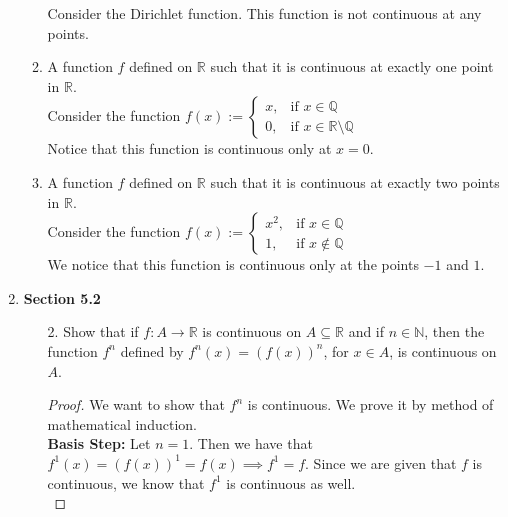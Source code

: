\documentclass[12pt,letterpaper]{article}
\newcommand{\R}{\mathbb{R}}
\newcommand{\N}{\mathbb{N}}
\newcommand{\Q}{\mathbb{Q}}
\theoremstyle{case}
\theoremstyle{definition}
\begin{document}
\begin{enumerate}
\begin{enumerate}
			Consider the Dirichlet function. This function is not continuous at any points.
			
			\item A function $f$ defined on $\R$ such that it is continuous at exactly one point in $\R$.\\
			
			Consider the function $f(x):= \begin{cases}
				x, & \text{if } x \in \Q \\
				0, & \text{if } x \in \R \setminus \Q
			\end{cases}$ \\
			Notice that this function is continuous only at $x=0$.
			
			\item A function $f$ defined on $\R$ such that it is continuous at exactly two points in $\R$.\\
			
			Consider the function $f(x):=\begin{cases}
				x^2, & \text{if } x \in \Q \\
				1, &\text{if } x \notin \Q
			\end{cases}$ \\
			We notice that this function is continuous only at the points $-1$ and $1$.
		\end{enumerate}	
	
		\item \textbf{Section 5.2}
		\begin{enumerate}
			\item[2.] Show that if $f:A \to \R$ is continuous on $A \subseteq \R$ and if $n \in \N$, then the function $f^n$ defined by $f^n(x)=(f(x))^n$, for $x \in A$, is continuous on $A$.\\
			
			\begin{proof}
				We want to show that $f^n$ is continuous. We prove it by method of mathematical induction.\\
				
				\textbf{Basis Step:} Let $n=1$. Then we have that $f^1(x)=(f(x))^1=f(x) \implies f^1=f$. Since we are given that $f$ is continuous, we know that $f^1$ is continuous as well.\\
				

\end{proof}
\end{enumerate}
\end{enumerate}
\end{document}

